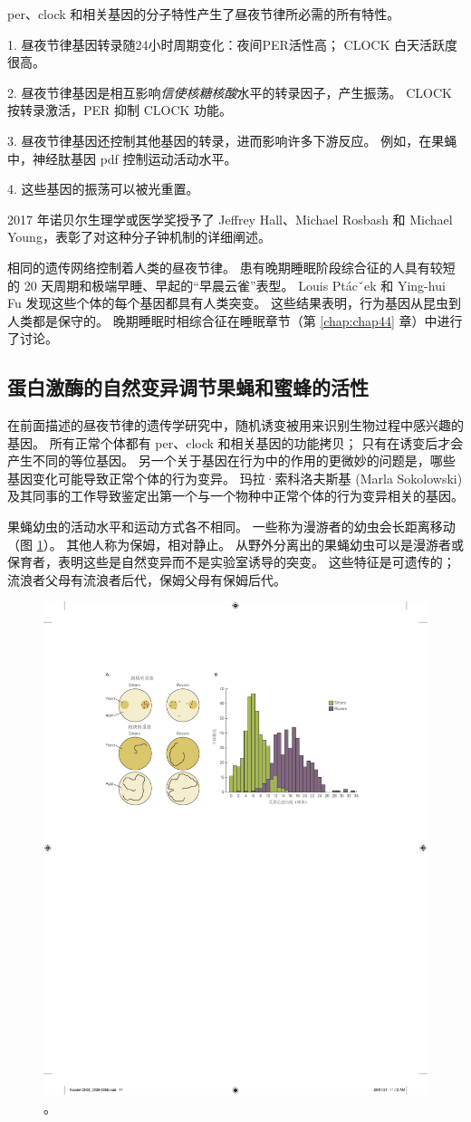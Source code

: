 per、clock 和相关基因的分子特性产生了昼夜节律所必需的所有特性。

1. 昼夜节律基因转录随24小时周期变化：夜间PER活性高； CLOCK 白天活跃度很高。

2. 昼夜节律基因是相互影响\textit{信使核糖核酸}水平的转录因子，产生振荡。 CLOCK 按转录激活，PER 抑制 CLOCK 功能。

3. 昼夜节律基因还控制其他基因的转录，进而影响许多下游反应。 例如，在果蝇中，神经肽基因 pdf 控制运动活动水平。

4. 这些基因的振荡可以被光重置。

2017 年诺贝尔生理学或医学奖授予了 Jeffrey Hall、Michael Rosbash 和 Michael Young，表彰了对这种分子钟机制的详细阐述。

相同的遗传网络控制着人类的昼夜节律。 
患有晚期睡眠阶段综合征的人具有较短的 20 天周期和极端早睡、早起的“早晨云雀”表型。 
Louis Ptácˇek 和 Ying-hui Fu 发现这些个体的每个基因都具有人类突变。 
这些结果表明，行为基因从昆虫到人类都是保守的。 
晚期睡眠时相综合征在睡眠章节（第 \ref{chap:chap44} 章）中进行了讨论。


\subsection{蛋白激酶的自然变异调节果蝇和蜜蜂的活性}
在前面描述的昼夜节律的遗传学研究中，随机诱变被用来识别生物过程中感兴趣的基因。 
所有正常个体都有 per、clock 和相关基因的功能拷贝； 只有在诱变后才会产生不同的等位基因。 
另一个关于基因在行为中的作用的更微妙的问题是，哪些基因变化可能导致正常个体的行为变异。 
玛拉·索科洛夫斯基 (Marla Sokolowski) 及其同事的工作导致鉴定出第一个与一个物种中正常个体的行为变异相关的基因。


果蝇幼虫的活动水平和运动方式各不相同。 
一些称为漫游者的幼虫会长距离移动（图 \ref{fig:2_14}）。 
其他人称为保姆，相对静止。 
从野外分离出的果蝇幼虫可以是漫游者或保育者，表明这些是自然变异而不是实验室诱导的突变。 
这些特征是可遗传的； 流浪者父母有流浪者后代，保姆父母有保姆后代。

\begin{figure}[htbp]
	\centering
	\includegraphics[width=0.5\linewidth]{chap02/fig_2_14}
	\caption{。}
	\label{fig:2_14}
\end{figure}


